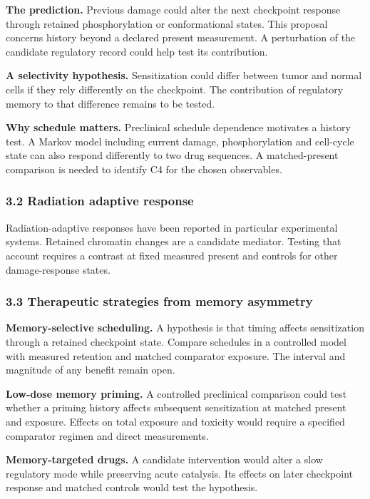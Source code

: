 \documentclass[
]{article}
\begin{document}
\textbf{The prediction.} Previous damage could alter the next checkpoint
response through retained phosphorylation or conformational states. This
proposal concerns history beyond a declared present measurement. A
perturbation of the candidate regulatory record could help test its
contribution.

\textbf{A selectivity hypothesis.} Sensitization could differ between
tumor and normal cells if they rely differently on the checkpoint. The
contribution of regulatory memory to that difference remains to be
tested.

\textbf{Why schedule matters.} Preclinical schedule dependence motivates
a history test. A Markov model including current damage, phosphorylation
and cell-cycle state can also respond differently to two drug sequences.
A matched-present comparison is needed to identify C4 for the chosen
observables.

\hypertarget{radiation-adaptive-response}{%
\subsubsection{3.2 Radiation adaptive
response}\label{radiation-adaptive-response}}

Radiation-adaptive responses have been reported in particular
experimental systems. Retained chromatin changes are a candidate
mediator. Testing that account requires a contrast at fixed measured
present and controls for other damage-response states.

\hypertarget{therapeutic-strategies-from-memory-asymmetry}{%
\subsubsection{3.3 Therapeutic strategies from memory
asymmetry}\label{therapeutic-strategies-from-memory-asymmetry}}

\textbf{Memory-selective scheduling.} A hypothesis is that timing
affects sensitization through a retained checkpoint state. Compare
schedules in a controlled model with measured retention and matched
comparator exposure. The interval and magnitude of any benefit remain
open.

\textbf{Low-dose memory priming.} A controlled preclinical comparison
could test whether a priming history affects subsequent sensitization at
matched present and exposure. Effects on total exposure and toxicity
would require a specified comparator regimen and direct measurements.

\textbf{Memory-targeted drugs.} A candidate intervention would alter a
slow regulatory mode while preserving acute catalysis. Its effects on
later checkpoint response and matched controls would test the
hypothesis.
\end{document}
